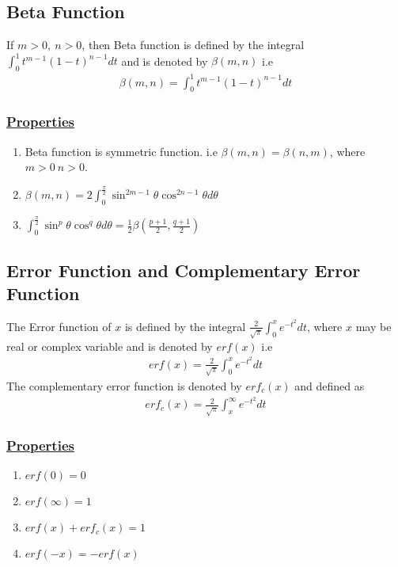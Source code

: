 \documentclass[11pt]{report}
\newcommand{\ubt}[1]{\textbf{\underline{#1}}}
\newcommand{\dsp}{\displaystyle}
\newcommand{\properties}{\subsubsection{\ubt{Properties}}}
\renewcommand{\labelenumi}{\roman{enumi}.}
\begin{document}
	\subsection{Beta Function}
	If $m>0, ~ n>0$, then Beta function is defined by the integral $\dsp\int_0^1t^{m-1}(1-t)^{n-1}dt$ and is denoted by $\beta(m,n)$ i.e
	\begin{eqnarray}
		\beta(m,n) = \int_0^1t^{m-1}(1-t)^{n-1}dt \label{eq:2_2}
	\end{eqnarray}

	\properties
	\begin{enumerate}
		\renewcommand{\labelenumi}{\roman{enumi}.}
		\item Beta function is symmetric function. i.e $\beta(m,n) = \beta(n,m)$, where $m>0~ n>0$.
		
		\item $\dsp\beta(m,n) = 2\int_0^{\frac{\pi}{2}}\sin^{2m-1}\theta\cos^{2n-1}\theta d\theta$
		
		\item $\dsp\int_0^{\frac{\pi}{2}}\sin^{p}\theta\cos^{q}\theta d\theta = \frac{1}{2}\beta\left(\frac{p+1}{2}, \frac{q+1}{2}\right) $
	\end{enumerate}
	
	
	\subsection{Error Function and Complementary Error Function}
	The Error function of $x$ is defined by the integral $\dsp\frac{2}{\sqrt{\pi}}\int_0^x e^{-t^2}dt$, where $x$ may be real or complex variable and is denoted by $erf(x)$ i.e
	\begin{eqnarray}
		erf(x) = \frac{2}{\sqrt{\pi}}\int_0^x e^{-t^2}dt \label{eq:2_3}
	\end{eqnarray}
	The complementary error function is denoted by $erf_c(x)$ and defined as
	\begin{eqnarray}
		erf_c(x) = \frac{2}{\sqrt{\pi}}\int_x^\infty e^{-t^2}dt \label{eq:2_4}
	\end{eqnarray}
	
	\properties
	\begin{enumerate}
		\renewcommand{\labelenumi}{\roman{enumi}.}
		\item $erf(0) = 0$
		\item $erf(\infty) = 1$
		\item $erf(x) + erf_c(x) = 1$
		\item $erf(-x) = -erf(x)$
	\end{enumerate}
	
\end{document}
